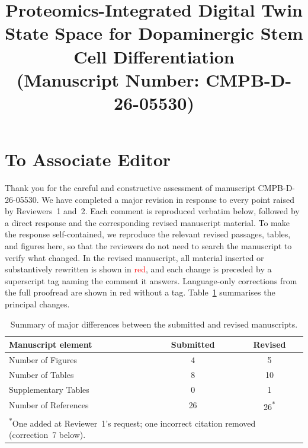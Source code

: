 \documentclass[11pt]{article}
\title{Proteomics-Integrated Digital Twin State Space for Dopaminergic Stem Cell Differentiation \\ (Manuscript Number: CMPB-D-26-05530)}
\author{}
\date{}
\newcounter{reviewer}
\newcounter{point}[reviewer]
\newcommand{\editorsection}{\section*{To Associate Editor}}
\newcommand\T{\rule{0pt}{2.5ex}}       %
\newcommand\B{\rule[-1.3ex]{0pt}{0pt}} %
\begin{document}
\maketitle

\vspace{10 pt}

\newpage
\editorsection
\justifying
Thank you for the careful and constructive assessment of manuscript CMPB-D-26-05530. We have completed a major revision in response to every point raised by Reviewers~1 and~2. Each comment is reproduced verbatim below, followed by a direct response and the corresponding revised manuscript material. To make the response self-contained, we reproduce the relevant revised passages, tables, and figures here, so that the reviewers do not need to search the manuscript to verify what changed. In the revised manuscript, all material inserted or substantively rewritten is shown in \textcolor{red}{red}, and each change is preceded by a superscript tag naming the comment it answers. Language-only corrections from the full proofread are shown in red without a tag. Table~\ref{edited} summarises the principal changes.

 \begin{table}[!thbp]
    \caption{Summary of major differences between the submitted and revised manuscripts.}
    \label{edited}
    \centering
    \begin{tabular}{l|c|c}
    \hline\hline
    Manuscript element & Submitted & Revised\T\B\\ \hline\hline
        Number of Figures                      & 4 &  5 \T\B\\\hline
        Number of Tables                       & 8 & 10 \T\B\\\hline
        Supplementary Tables                   & 0 & 1 \T\B\\\hline
        Number of References                   & 26 & 26\textsuperscript{$*$} \T\B\\ \hline\hline
    \multicolumn{3}{l}{\footnotesize\textsuperscript{$*$}One added at Reviewer~1's request; one incorrect citation removed (correction~7 below).}
    \end{tabular}
    \vspace{-4mm}
    \end{table}
\end{document}
